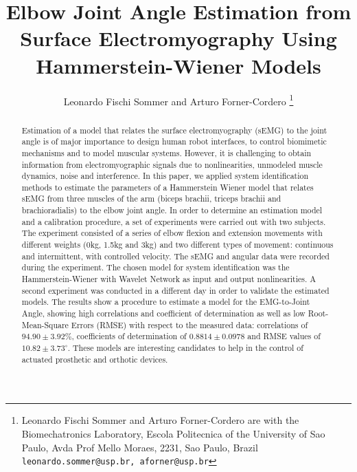 \documentclass[letterpaper, 10 pt, conference]{ieeeconf}  %
\title{\LARGE \bf Elbow Joint Angle Estimation from Surface Electromyography Using Hammerstein-Wiener Models
}
\author{Leonardo Fischi Sommer and Arturo Forner-Cordero%
\thanks{Leonardo Fischi Sommer and Arturo Forner-Cordero are with the Biomechatronics Laboratory, Escola Politecnica of the University of Sao Paulo, Avda Prof Mello Moraes, 2231, Sao Paulo, Brazil {\tt\small leonardo.sommer@usp.br, aforner@usp.br}}
}
\begin{document}
\maketitle
\thispagestyle{empty}
\pagestyle{empty}


\begin{abstract}


Estimation of a model that relates the surface electromyography (sEMG) to the joint angle is of major importance to design human robot interfaces, to control biomimetic mechanisms and to model muscular systems. However, it is challenging to obtain information from electromyographic signals due to nonlinearities, unmodeled muscle dynamics, noise and interference. In this paper, we applied system identification methods to estimate the parameters of a Hammerstein Wiener model that relates sEMG from three muscles of the arm (biceps brachii, triceps brachii and brachioradialis) to the elbow joint angle. In order to determine an estimation model and a calibration procedure, a set of experiments were carried out with two subjects. The experiment consisted of a series of elbow flexion and extension movements with different weights (0kg, 1.5kg and 3kg) and two different types of movement: continuous and intermittent, with controlled velocity. The sEMG and angular data were recorded during the experiment. The chosen model for system identification was the Hammerstein-Wiener with Wavelet Network as input and output nonlinearities. A second experiment was conducted in a different day in order to validate the estimated models. The results show a procedure to estimate a model for the EMG-to-Joint Angle, showing high correlations and coefficient of determination as well as low Root-Mean-Square Errors (RMSE) with respect to the measured data: correlations of $94.90 \pm 3.92\%$, coefficients of determination of $0.8814 \pm 0.0978$ and RMSE values of $10.82 \pm 3.73^\circ$. 
These models are interesting candidates to help in the control of actuated prosthetic and orthotic devices.


\end{abstract}
\end{document}
